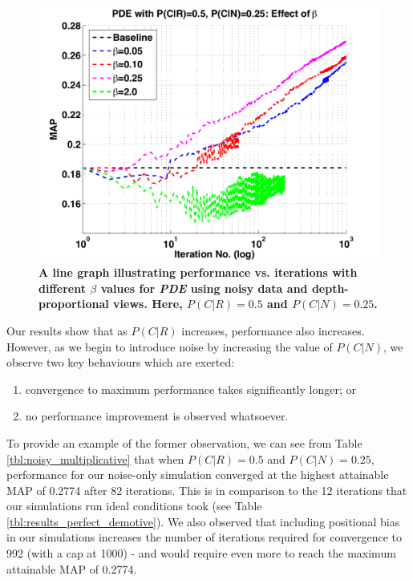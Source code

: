 \begin{figure}[t!]
	\begin{center}
	\includegraphics[width=\linewidth]{pics/noise/noise_pde_beta.pdf}
	\end{center}
	\vspace{-0.5cm}
	\caption{\label{fig:noise_pde_beta}\textbf{A line graph illustrating performance vs. iterations with different $\beta$ values for \emph{PDE} using noisy data and depth-proportional views. Here, $P(C|R) = 0.5$ and $P(C|N) = 0.25$.}\vspace{-0.25cm}}
\end{figure}

Our results show that as $P(C|R)$ increases, performance also increases. However, as we begin to introduce noise by increasing the value of $P(C|N)$, we observe two key behaviours which are exerted:

\begin{enumerate}
	
	\item{convergence to maximum performance takes significantly longer; or}
	
	\item{no performance improvement is observed whatsoever.}
	
\end{enumerate}

To provide an example of the former observation, we can see from Table \ref{tbl:noisy_multiplicative} that when $P(C|R) = 0.5$ and $P(C|N) = 0.25$, performance for our noise-only simulation converged at the highest attainable MAP of 0.2774 after 82 iterations. This is in comparison to the 12 iterations that our simulations run ideal conditions took (see Table \ref{tbl:results_perfect_demotive}). We also observed that including positional bias in our simulations increases the number of iterations required for convergence to 992 (with a cap at 1000) - and would require even more to reach the maximum attainable MAP of 0.2774.


